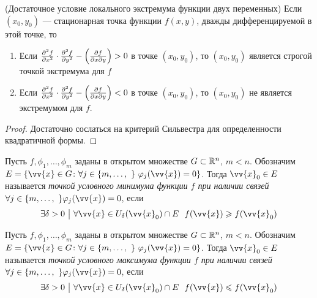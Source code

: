 \begin{corollary} (Достаточное условие локального экстремума функции двух переменных)
	Если $(x_0, y_0)$ --- стационарная точка функции $f(x, y)$, дважды дифференцируемой в этой точке, то
	\begin{enumerate}
		\item Если $\frac{\partial ^2 f}{\partial x^2} \cdot \frac{\partial ^2 f}{\partial y^2} - \left(\frac{\partial f}{\partial x \partial y}\right) > 0$ в точке $(x_0, y_0)$, то $(x_0, y_0)$ является строгой точкой экстремума для $f$
		
		\item Если $\frac{\partial ^2 f}{\partial x^2} \cdot \frac{\partial ^2 f}{\partial y^2} - \left(\frac{\partial f}{\partial x \partial y}\right) < 0$ в точке $(x_0, y_0)$, то $(x_0, y_0)$ не является экстремумом для $f$.
	\end{enumerate}
\end{corollary}

\begin{proof}
	Достаточно сослаться на критерий Сильвестра для определенности квадратичной формы.
\end{proof}

\begin{definition}
	Пусть $f, \phi_1, \ldots, \phi_m$ заданы в открытом множестве $G \subset \mathbb{R}^n$, $m < n$. Обозначим $E = \{\vv{x} \in G \colon \forall j \in \range{m}\ \ \phi_j(\vv{x}) = 0\}$. Тогда $\vv{x}_0 \in E$ называется \textit{точкой условного минимума функции $f$ при наличии связей $\forall j \in \range{m}\ \phi_j(\vv{x}) = 0$}, если
	\[
		\exists \delta > 0 \such \forall \vv{x} \in U_\delta(\vv{x}_0) \cap E\ \ f(\vv{x}) \ge f(\vv{x}_0)
	\]
\end{definition}

\begin{definition}
	Пусть $f, \phi_1, \ldots, \phi_m$ заданы в открытом множестве $G \subset \mathbb{R}^n$, $m < n$. Обозначим $E = \{\vv{x} \in G \colon \forall j \in \range{m}\ \ \phi_j(\vv{x}) = 0\}$. Тогда $\vv{x}_0 \in E$ называется \textit{точкой условного максимума функции $f$ при наличии связей $\forall j \in \range{m}\ \phi_j(\vv{x}) = 0$}, если
	\[
	\exists \delta > 0 \such \forall \vv{x} \in U_\delta(\vv{x}_0) \cap E\ \ f(\vv{x}) \le f(\vv{x}_0)
	\]
\end{definition}

